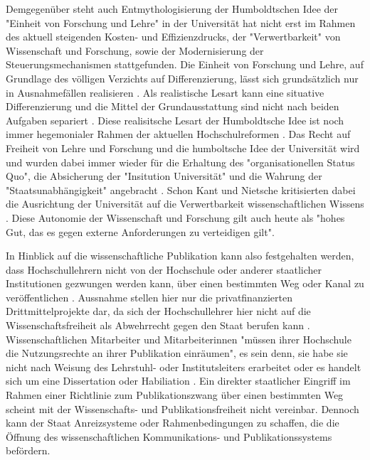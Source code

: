 Demgegenüber steht auch Entmythologisierung der Humboldtschen Idee der "Einheit von Forschung und Lehre" in der Universität hat nicht erst im Rahmen des aktuell steigenden Kosten- und Effizienzdrucks, der "Verwertbarkeit" von Wissenschaft und Forschung, sowie der Modernisierung der Steuerungsmechanismen stattgefunden. Die Einheit von Forschung und Lehre, auf Grundlage des völligen Verzichts auf Differenzierung, lässt sich grundsätzlich nur in Ausnahmefällen realisieren \cite{Schimank_2001}. Als realistische Lesart kann eine situative Differenzierung und die Mittel der Grundausstattung sind nicht nach beiden Aufgaben separiert \cite{Schimank_2001}. Diese realisitsche Lesart der Humboldtsche Idee ist noch immer hegemonialer Rahmen der aktuellen Hochschulreformen \cite{Huber_2005}. Das Recht auf Freiheit von Lehre und Forschung und die humboltsche Idee der Universität wird und wurden dabei immer wieder für die Erhaltung des "organisationellen Status Quo", die Absicherung der "Insitution Universität" und die Wahrung der "Staatsunabhängigkeit" angebracht \cite{Huber_2005}. Schon Kant und Nietsche kritisierten dabei die Ausrichtung der Universität auf die Verwertbarkeit wissenschaftlichen Wissens \cite{Huber_2005}. Diese Autonomie der Wissenschaft und Forschung gilt auch heute als "hohes Gut, das es gegen externe Anforderungen zu verteidigen gilt"\cite{kaldewey_2010}.

In Hinblick auf die wissenschaftliche Publikation kann also festgehalten werden, dass Hochschullehrern nicht von der Hochschule oder anderer staatlicher Institutionen gezwungen werden kann, über einen bestimmten Weg oder Kanal zu veröffentlichen \cite{spindler_2006_rechtloa}. Aussnahme stellen hier nur die privatfinanzierten Drittmittelprojekte dar, da sich der Hochschullehrer hier nicht auf die Wissenschaftsfreiheit als Abwehrrecht gegen den Staat berufen kann \cite{spindler_2006_rechtloa}. Wissenschaftlichen Mitarbeiter und Mitarbeiterinnen "müssen ihrer Hochschule die Nutzungsrechte an ihrer Publikation einräumen", es sein denn, sie habe sie nicht nach Weisung des Lehrstuhl- oder Institutsleiters erarbeitet oder es handelt sich um eine Dissertation oder Habiliation \cite{spindler_2006_rechtloa}. Ein direkter staatlicher Eingriff im Rahmen einer Richtlinie zum Publikationszwang über einen bestimmten Weg scheint mit der Wissenschafts- und Publikationsfreiheit nicht vereinbar. Dennoch kann der Staat Anreizsysteme oder Rahmenbedingungen zu schaffen, die die Öffnung des wissenschaftlichen Kommunikations- und Publikationssystems befördern.

